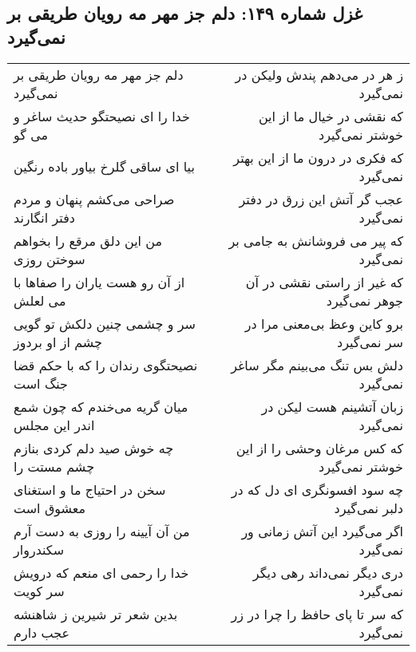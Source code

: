 \begin{center}
\section*{غزل شماره ۱۴۹: دلم جز مهر مه رویان طریقی بر نمی‌گیرد}
\label{sec:sh149}
\begin{longtable}{l p{0.5cm} r}
دلم جز مهر مه رویان طریقی بر نمی‌گیرد
&&
ز هر در می‌دهم پندش ولیکن در نمی‌گیرد
\\
خدا را ای نصیحتگو حدیث ساغر و می گو
&&
که نقشی در خیال ما از این خوشتر نمی‌گیرد
\\
بیا ای ساقی گلرخ بیاور باده رنگین
&&
که فکری در درون ما از این بهتر نمی‌گیرد
\\
صراحی می‌کشم پنهان و مردم دفتر انگارند
&&
عجب گر آتش این زرق در دفتر نمی‌گیرد
\\
من این دلق مرقع را بخواهم سوختن روزی
&&
که پیر می فروشانش به جامی بر نمی‌گیرد
\\
از آن رو هست یاران را صفاها با می لعلش
&&
که غیر از راستی نقشی در آن جوهر نمی‌گیرد
\\
سر و چشمی چنین دلکش تو گویی چشم از او بردوز
&&
برو کاین وعظ بی‌معنی مرا در سر نمی‌گیرد
\\
نصیحتگوی رندان را که با حکم قضا جنگ است
&&
دلش بس تنگ می‌بینم مگر ساغر نمی‌گیرد
\\
میان گریه می‌خندم که چون شمع اندر این مجلس
&&
زبان آتشینم هست لیکن در نمی‌گیرد
\\
چه خوش صید دلم کردی بنازم چشم مستت را
&&
که کس مرغان وحشی را از این خوشتر نمی‌گیرد
\\
سخن در احتیاج ما و استغنای معشوق است
&&
چه سود افسونگری ای دل که در دلبر نمی‌گیرد
\\
من آن آیینه را روزی به دست آرم سکندروار
&&
اگر می‌گیرد این آتش زمانی ور نمی‌گیرد
\\
خدا را رحمی ای منعم که درویش سر کویت
&&
دری دیگر نمی‌داند رهی دیگر نمی‌گیرد
\\
بدین شعر تر شیرین ز شاهنشه عجب دارم
&&
که سر تا پای حافظ را چرا در زر نمی‌گیرد
\\
\end{longtable}
\end{center}

